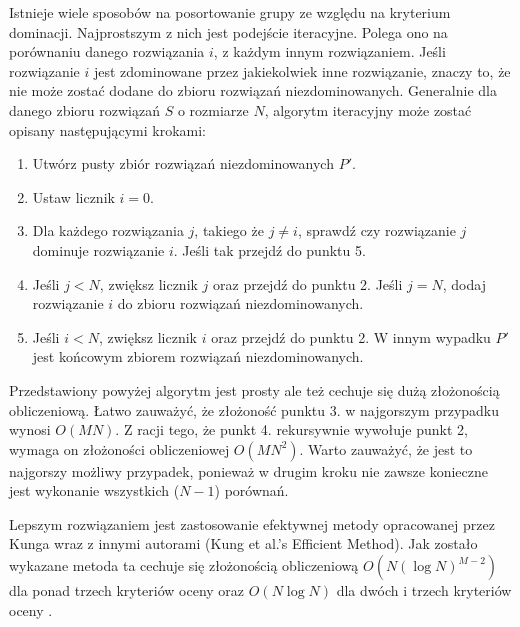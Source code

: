 \documentclass[twoside]{iisthesis}
\begin{document}
Istnieje wiele sposobów na posortowanie grupy ze względu na kryterium dominacji. Najprostszym z nich jest podejście iteracyjne. Polega ono na porównaniu danego rozwiązania $i$, z każdym innym rozwiązaniem. Jeśli rozwiązanie $i$ jest zdominowane przez jakiekolwiek inne rozwiązanie, znaczy to, że nie może zostać dodane do zbioru rozwiązań niezdominowanych. Generalnie dla danego zbioru rozwiązań $S$ o rozmiarze $N$, algorytm iteracyjny może zostać opisany następującymi krokami:\\

\begin{enumerate}
	\item Utwórz pusty zbiór rozwiązań niezdominowanych $P'$.
	\item Ustaw licznik $i = 0$.
	\item Dla każdego rozwiązania $j$, takiego że $j \neq i$, sprawdź czy rozwiązanie $j$ dominuje rozwiązanie $i$. Jeśli tak przejdź do punktu 5.
	\item Jeśli $j < N$, zwiększ licznik $j$ oraz przejdź do punktu 2. Jeśli $j = N$, dodaj rozwiązanie $i$ do zbioru rozwiązań niezdominowanych.
	\item Jeśli $i < N$, zwiększ licznik $i$ oraz przejdź do punktu 2. W innym wypadku $P'$ jest końcowym zbiorem rozwiązań niezdominowanych.\\
\end{enumerate}
Przedstawiony powyżej algorytm jest prosty ale też cechuje się dużą złożonością obliczeniową. Łatwo zauważyć, że złożoność punktu 3. w najgorszym przypadku wynosi $O(MN)$. Z racji tego, że punkt 4. rekursywnie wywołuje punkt 2, wymaga on złożoności obliczeniowej $O(MN^{2})$. Warto zauważyć, że jest to najgorszy możliwy przypadek, ponieważ w drugim kroku nie zawsze konieczne jest wykonanie wszystkich ($N-1$) porównań\cite{book}.

Lepszym rozwiązaniem jest zastosowanie efektywnej metody opracowanej przez Kunga wraz z innymi autorami (Kung et al.'s Efficient Method). Jak zostało wykazane metoda ta cechuje się złożonością obliczeniową $O(N(\log N)^{M-2})$ dla ponad trzech kryteriów oceny oraz $O(N\log N)$ dla dwóch i trzech kryteriów oceny \cite{kung}.
\end{document}
